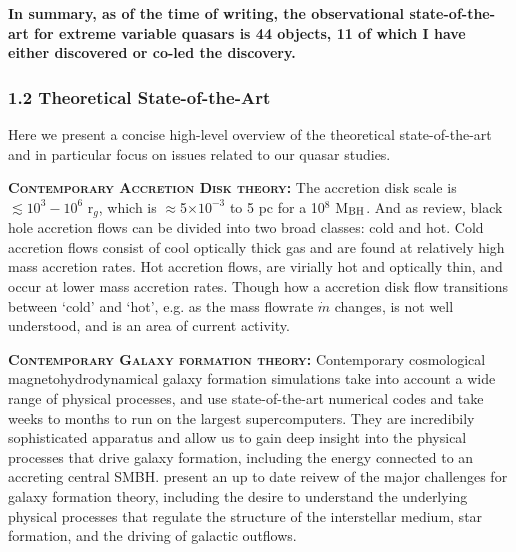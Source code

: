 \smallskip
\smallskip
\noindent
{\bf In summary, as of the time of writing, the
observational state-of-the-art for extreme variable quasars is 44
objects, 11 of which I have either discovered or co-led the
discovery.}




\subsubsection*{1.2 Theoretical State-of-the-Art}
Here we present a concise high-level overview of the theoretical
state-of-the-art and in particular focus on issues related to our
quasar studies.

\smallskip
\smallskip
\noindent
\textbf{\textsc{Contemporary Accretion Disk theory:}}
The accretion disk scale is $\lesssim 10^{3}-10^{6}$ r$_{g}$,
which is $\approx$5$\times$$10^{-3}$ to 5 pc for a 10$^{8}$ M$_{\rm
BH}$.  
And as \citet{YuanNarayan2014} review, black hole accretion flows can be divided into two broad classes: cold and hot. Cold accretion flows consist of cool optically thick gas and are found at relatively high mass accretion rates. 
Hot accretion flows, are virially hot and optically thin, and occur at lower mass accretion rates. %
Though how a accretion disk flow transitions between `cold' and `hot', e.g. as the mass flowrate $\dot{m}$ changes, is not well understood, and is an area of current activity. %


\smallskip
\smallskip
\noindent
\textbf{\textsc{Contemporary Galaxy formation theory:}}
Contemporary cosmological magnetohydrodynamical galaxy formation
simulations take into account a wide range of physical processes, and
use state-of-the-art numerical codes and take weeks to months to run
on the largest supercomputers.  They are incredibily sophisticated
apparatus and allow us to gain deep insight into the physical
processes that drive galaxy formation, including the energy connected
to an accreting central SMBH. \citet{NaabOstriker2017} present an up
to date reivew of the major challenges for galaxy formation theory,
including the desire to understand the underlying physical processes
that regulate the structure of the interstellar medium, star
formation, and the driving of galactic outflows.

